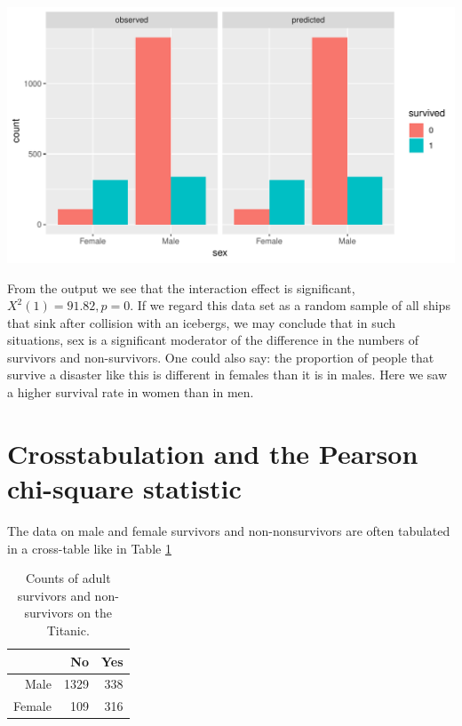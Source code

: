 \documentclass[]{report}\usepackage[]{graphicx}\usepackage[]{color}
\makeatletter
\def\maxwidth{ %
  \ifdim\Gin@nat@width>\linewidth
    \linewidth
  \else
    \Gin@nat@width
  \fi
}
\makeatother
\begin{document}
{\centering \includegraphics[width=\maxwidth]{figure/gen_23-1} 

}




From the output we see that the interaction effect is significant, $X^2(1)=91.82, p=0$. If we regard this data set as a random sample of all ships that sink after collision with an icebergs, we may conclude that in such situations, sex is a significant moderator of the difference in the numbers of survivors and non-survivors. One could also say: the proportion of people that survive a disaster like this is different in females than it is in males. Here we saw a higher survival rate in women than in men.


\section{Crosstabulation and the Pearson chi-square statistic}

The data on male and female survivors and non-nonsurvivors are often tabulated in a cross-table like in Table \ref{tab:gen_24}


\begin{table}[ht]
\centering
\caption{Counts of adult survivors and non-survivors on the Titanic.} 
\label{tab:gen_24}
\begin{tabular}{rrr}
  \hline
 & No & Yes \\ 
  \hline
Male & 1329 & 338 \\ 
  Female & 109 & 316 \\ 
   \hline
\end{tabular}
\end{table}
\end{document}
